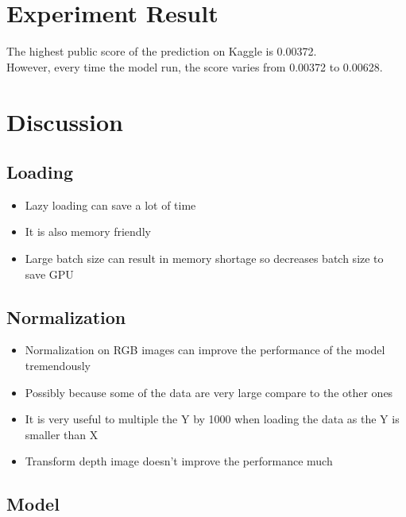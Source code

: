 \documentclass[11pt]{article}
\providecommand{\tightlist}{%
      \setlength{\itemsep}{0pt}\setlength{\parskip}{0pt}}
\begin{document}
    \hypertarget{experiment-result}{%
\section{Experiment Result}\label{experiment-result}}

    The highest public score of the prediction on Kaggle is 0.00372.\\
However, every time the model run, the score varies from 0.00372 to
0.00628.

    \hypertarget{discussion}{%
\section{Discussion}\label{discussion}}

    \hypertarget{loading}{%
\subsection{Loading}\label{loading}}

    \begin{itemize}
\tightlist
\item
  Lazy loading can save a lot of time
\item
  It is also memory friendly
\item
  Large batch size can result in memory shortage so decreases batch size
  to save GPU
\end{itemize}

    \hypertarget{normalization}{%
\subsection{Normalization}\label{normalization}}

    \begin{itemize}
\tightlist
\item
  Normalization on RGB images can improve the performance of the model
  tremendously
\item
  Possibly because some of the data are very large compare to the other
  ones
\item
  It is very useful to multiple the Y by 1000 when loading the data as
  the Y is smaller than X
\item
  Transform depth image doesn't improve the performance much
\end{itemize}

    \hypertarget{model}{%
\subsection{Model}\label{model}}
\end{document}
